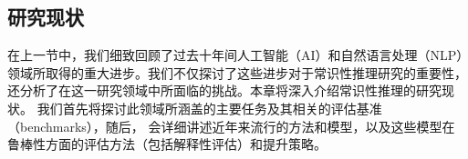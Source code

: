 





%



\iffalse
\subsection{研究现状}
\label{sec1:related}
在上一节中，我们细致回顾了过去十年间人工智能（AI）和自然语言处理（NLP）领域所取得的重大进步。我们不仅探讨了这些进步对于常识性推理研究的重要性，
还分析了在这一研究领域中所面临的挑战。本章将深入介绍常识性推理的研究现状。
我们首先将探讨此领域所涵盖的主要任务及其相关的评估基准（benchmarks），随后，
会详细讲述近年来流行的方法和模型，以及这些模型在鲁棒性方面的评估方法（包括解释性评估）和提升策略。

